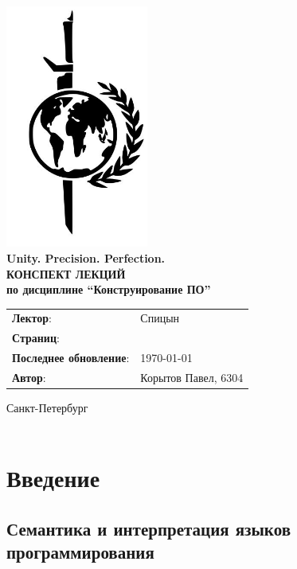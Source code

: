 \documentclass[a4paper, 14pt]{extarticle}
\begin{document}
\begin{titlepage}
    {\centering
        {\bfseries
            \includegraphics[height=8cm]{../res/logo.jpeg}\\
            Unity. Precision. Perfection.\\
            \vspace{3.5cm}
            \uppercase{Конспект лекций} \\
            по дисциплине \enquote{Конструирование ПО}\\
        }
        \vspace{\fill}
    }
    \begin{tabular}{l l}
        \textbf{Лектор}: & Спицын\\
        \textbf{Страниц}: &\pageref{LastPage}\\
        \textbf{Последнее обновление}: & \today{}\\ 
        \textbf{Автор}: & Корытов Павел, 6304\\
    \end{tabular}

    \vspace{2cm}
    {\centering
        Санкт-Петербург \\
        \the\year\\
    }
\end{titlepage}

\tableofcontents
\newpage
\section{Введение}
\subsection{Семантика и интерпретация языков программирования}
\end{document}
